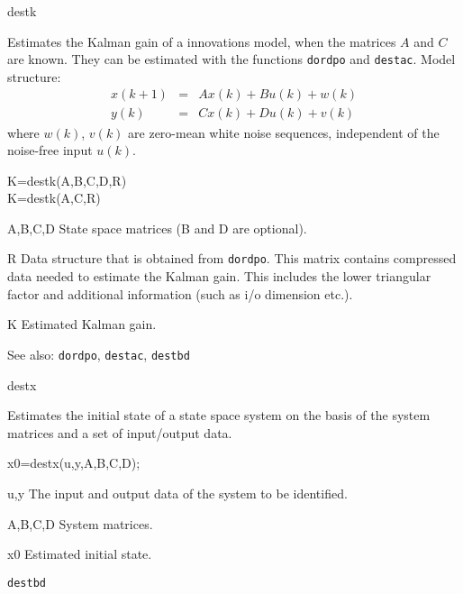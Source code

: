 \documentclass{book}
\newcommand{\destbd}{\texttt{destbd}}
\newcommand{\dordpo}{\texttt{dordpo}}
\newcommand{\destac}{\texttt{destac}}
\begin{document}
\begin{command}{destk}
  \begin{purpose}
    Estimates the Kalman gain of a innovations model, when the matrices $A$
    and $C$ are known. They can be estimated with the
    functions {\dordpo} and {\destac}. 
    Model structure:
    \begin{eqnarray*}
      x(k+1) & = &  A x(k) + B u(k)+ w(k)\\
      y(k) & = & C x(k) + D u(k) + v(k)
    \end{eqnarray*}
    where $w(k)$, $v(k)$ are zero-mean white noise sequences,
    independent of the noise-free input $u(k)$. 
  \end{purpose}   
  \begin{syntax}
           K=destk(A,B,C,D,R)\\
           K=destk(A,C,R)
  \end{syntax}
  \begin{inputs}
  \item[A,B,C,D] State space matrices (B and D are optional).
  \item[R] Data structure that is obtained from {\dordpo}. This matrix
    contains compressed data needed to estimate the Kalman gain. This
    includes the lower triangular factor and additional information
    (such as i/o dimension etc.).
   
  \end{inputs}
\begin{outputs}  
\item[K] Estimated Kalman gain.
\end{outputs}
  \begin{seealso}
    See also:  {\dordpo}, {\destac}, {\destbd}
  \end{seealso}
\end{command}%

\begin{command}{destx}
\begin{purpose}
  Estimates the initial state of a state space system on the basis of
  the system matrices and a set of input/output data.
\end{purpose}
\begin{syntax}
  x0=destx(u,y,A,B,C,D);
\end{syntax}
\begin{inputs}
\item[u,y] The input and output data of the system to be identified.
\item[A,B,C,D] System matrices.
\end{inputs}
\begin{outputs}
\item[x0] Estimated initial state.
\end{outputs}
\begin{seealso}
{\destbd}
\end{seealso}
\end{command}%
\end{document}
